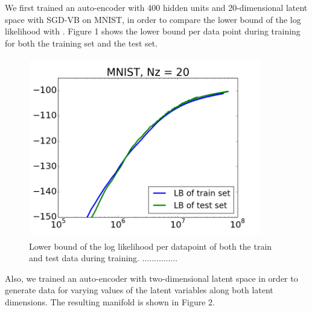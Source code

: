 \documentclass{article}
\begin{document}
We first trained an auto-encoder with 400 hidden units and 20-dimensional latent space with SGD-VB on MNIST, in order to compare the lower bound of the log likelihood with \cite{kingma2013auto}. Figure 1 shows the lower bound per data point during training for both the training set and the test set.  \\ 

\begin{figure}[htb]
\begin{center}
\includegraphics[height=3.1in,width=4in]{lowerboundAEVBMNIST.png}
\caption{Lower bound of the log likelihood per datapoint of both the train and test data during training. ...............}
\end{center}
\end{figure}

Also, we trained an auto-encoder with two-dimensional latent space in order to generate data for varying values of the latent variables along both latent dimensions. The resulting manifold is shown in Figure 2.
\end{document}
